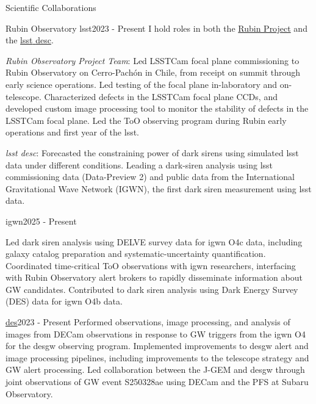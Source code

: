 \begin{rSection}{Scientific Collaborations}

\begin{rSubsection}{Rubin Observatory \ac{lsst}}{2023 - Present}{}{}
I hold roles in both the \href{https://rubinobservatory.org}{Rubin Project} and the \href{https://lsstdesc.slac.stanford.edu}{\ac{lsst} \ac{desc}}.

\textit{Rubin Observatory Project Team}: Led \ac{LSSTCam} focal plane commissioning to Rubin Observatory on Cerro-Pachón in Chile, from receipt on summit through early science operations. Led testing of the focal plane in-laboratory and on-telescope. Characterized defects in the \ac{LSSTCam} focal plane CCDs, and developed custom image processing tool to monitor the stability of defects in the \ac{LSSTCam} focal plane. Led the \ac{ToO} observing program during Rubin early operations and first year of the \ac{lsst}.

\textit{\ac{lsst} \ac{desc}}: Forecasted the constraining power of dark sirens using simulated \ac{lsst} data under different conditions. Leading a dark-siren analysis using \ac{lsst} commissioning data (Data-Preview 2) and public data from the International Gravitational Wave Network (IGWN), the first dark siren measurement using \ac{lsst} data.
\end{rSubsection}

\begin{rSubsection}{\ac{igwn}}{2025 - Present}{}{}

Led dark siren analysis using \ac{DELVE} survey data for \ac{igwn} O4c data, including galaxy catalog preparation and systematic-uncertainty quantification. Coordinated time-critical \ac{ToO} observations with \ac{igwn} researchers, interfacing with Rubin Observatory alert brokers to rapidly disseminate information about \ac{GW} candidates. Contributed to dark siren analysis using Dark Energy Survey (DES) data for \ac{igwn} O4b data.

\end{rSubsection}

\begin{rSubsection}{\href{https://www.darkenergysurvey.org/}{\ac{des}}}{2023 - Present}{}{}
Performed observations, image processing, and analysis of images from \ac{DECam} observations in response to \ac{GW} triggers from the \ac{igwn} \ac{O4} for the \ac{desgw} observing program. Implemented improvements to \ac{desgw} alert and image processing pipelines, including improvements to the telescope strategy and \ac{GW} alert processing. Led collaboration between the \ac{J-GEM} and \ac{desgw} through joint observations of \ac{GW} event S250328ae using \ac{DECam} and the \ac{PFS} at Subaru Observatory.


\end{rSubsection}
\end{rSection}

